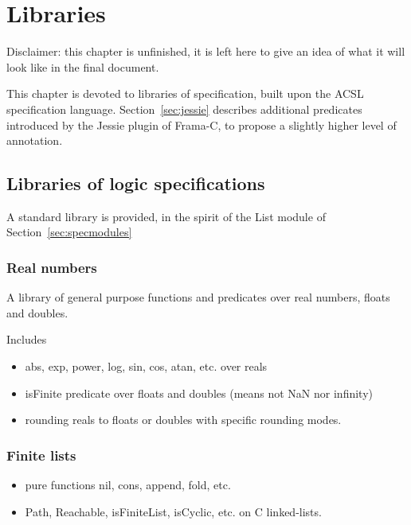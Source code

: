 \chapter{Libraries}
\label{chap:lib}

Disclaimer: this chapter is unfinished, it is left here to give
an idea of what it will look like in the final document.

This chapter is devoted to libraries of specification, built upon the
ACSL specification language.  Section~\ref{sec:jessie} describes
additional predicates introduced by the Jessie plugin of Frama-C, to
propose a slightly higher level of annotation.

\section{Libraries of logic specifications}
\label{sec:speclibraries}

A standard library is provided, in the spirit of the List module of
Section~\ref{sec:specmodules}


\subsection{Real numbers}
\label{sec:libreal}

A library of general purpose functions and predicates over real
numbers, floats and doubles.

Includes

\begin{itemize}
\item abs, exp, power, log, sin, cos, atan, etc. over reals

\item isFinite predicate over floats and doubles (means not NaN nor infinity)

\item rounding reals to floats or doubles with specific rounding modes.

\end{itemize}

\subsection{Finite lists}

\begin{itemize}
\item pure functions nil, cons, append, fold, etc.
\item Path, Reachable, isFiniteList, isCyclic, etc. on C linked-lists.
\end{itemize}


